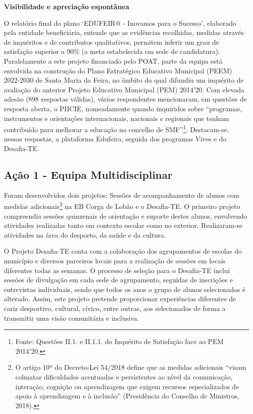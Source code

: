 \documentclass[
]{book}
\begin{document}
\textbf{Visibilidade e apreciação espontânea}

O relatório final do plano `EDUFEIR@ - Inovamos para o Sucesso', elaborado pela entidade beneficiária, entende que as evidências recolhidas, medidas através de inquéritos e de contributos qualitativos, permitem inferir um grau de satisfação superior a 90\% (a meta estabelecida em sede de candidatura). Paralelamente a este projeto financiado pelo POAT, parte da equipa está envolvida na construção do Plano Estratégico Educativo Municipal (PEEM) 2022-2030 de Santa Maria da Feira, no âmbito do qual difundiu um inquérito de avaliação do anterior Projeto Educativo Municipal (PEM) 2014'20. Com elevada adesão (898 respostas válidas), vários respondentes mencionaram, em questões de resposta aberta, o PIICIE, nomeadamente quando inquiridos sobre ``programas, instrumentos e orientações internacionais, nacionais e regionais que tenham contribuído para melhorar a educação no concelho de SMF''\footnote{Fonte: Questões II.1. e II.1.1. do Inquérito de Satisfação face ao PEM 2014'20.}. Destacam-se, nessas respostas, a plataforma Edufeira, seguida dos programas Vives e do Desafia-TE.

\hypertarget{auxe7uxe3o-1---equipa-multidisciplinar}{%
\subsection{\texorpdfstring{\textbf{Ação 1 - Equipa Multidisciplinar}}{Ação 1 - Equipa Multidisciplinar}}\label{auxe7uxe3o-1---equipa-multidisciplinar}}

Foram desenvolvidos dois projetos: Sessões de acompanhamento de alunos com medidas adicionais\footnote{O artigo 10º do Decreto-Lei 54/2018 define que as medidas adicionais ``visam colmatar dificuldades acentuadas e persistentes ao nível da comunicação, interação, cognição ou aprendizagem que exigem recursos especializados de apoio à aprendizagem e à inclusão'' (Presidência do Conselho de Ministros, 2018).} na EB Corga de Lobão e o Desafia-TE. O primeiro projeto compreendia sessões quinzenais de orientação e suporte destes alunos, envolvendo atividades realizadas tanto em contexto escolar como no exterior. Realizaram-se atividades na área do desporto, da saúde e da cultura.

O Projeto Desafia-TE conta com a colaboração dos agrupamentos de escolas do município e diversos parceiros locais para a realização de sessões em locais diferentes todas as semanas. O processo de seleção para o Desafia-TE inclui sessões de divulgação em cada sede de agrupamento, seguidas de inscrições e entrevistas individuais, sendo que todos os anos o grupo de alunos selecionados é alterado. Assim, este projeto pretende proporcionar experiências diferentes de cariz desportivo, cultural, cívico, entre outras, aos selecionados de forma a transmitir uma visão comunitária e inclusiva.
\end{document}
